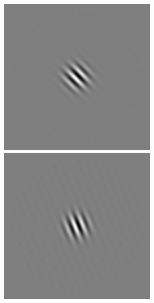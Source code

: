 \begin{figure}[ht]
\begin{center}
 \includegraphics[width=\columnwidth/9]{ch4/figures/iGabor3_6.jpg}
 \includegraphics[width=\columnwidth/9]{ch4/figures/iGabor3_7.jpg}\\

\end{center}
\end{figure}
